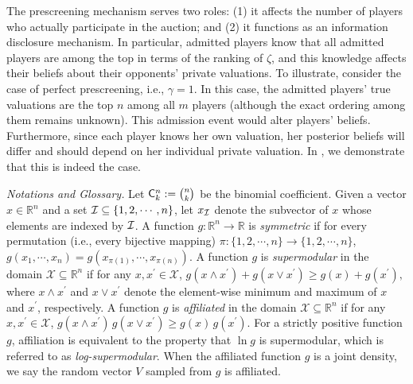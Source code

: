 The prescreening mechanism serves two roles: (1) it affects the number of players who actually participate in the auction; and (2) it functions as an information disclosure mechanism. In particular, admitted players know that all admitted players are among the top in terms of the ranking of $\zeta$, and this knowledge affects their beliefs about their opponents' private valuations. To illustrate, consider the case of perfect prescreening, i.e., $\gamma=1$. In this case, the admitted players' true valuations are the top $n$ among all $m$ players (although the exact ordering among them remains unknown).
This admission event would alter players' beliefs. Furthermore, since each player knows her own valuation, her posterior beliefs will differ and should depend on her individual private valuation.
In , we demonstrate that this is indeed the case.

\textit{Notations and Glossary.}
Let $\mathsf{C}^n_k := \binom{n}{k}$ be the binomial coefficient. Given a vector $x\in \mathbb{R}^n$ and a set $\mathcal{I}\subseteq\{1,2,\cdots,n\}$, let $x_{\mathcal{I}}$ denote the subvector of $x$ whose elements are indexed by $\mathcal{I}$.
A function $g:\mathbb{R}^n\to \mathbb{R}$ is \textit{symmetric} if for every permutation (i.e., every bijective mapping) $\pi:\{1,2,\cdots,n\}\to \{1,2,\cdots,n\}$, $g(x_1,\cdots,x_n)=g(x_{\pi(1)},\cdots,x_{\pi(n)}).$
A function $g$ is \textit{supermodular} in the domain $\mathcal{X}\subseteq\mathbb{R}^n$ if for any $x,x^\prime\in \mathcal{X}$, $g(x\wedge x^\prime)+ g(x\vee x^\prime)\geq g(x)+g(x^\prime),$
where $x\wedge x^\prime$ and $x\vee x^\prime$ denote the element-wise minimum and maximum of $x$ and $x^\prime$, respectively.
A function $g$ is \emph{affiliated} in the domain $\mathcal{X}\subseteq\mathbb{R}^n$ if for any $x,x^\prime\in \mathcal{X}$, $g(x\wedge x^\prime)\, g(x\vee x^\prime)\geq g(x)\, g(x^\prime).$
For a strictly positive function $g$, affiliation is equivalent to the property that $\ln g$ is supermodular, which is referred to as \textit{log-supermodular}.
When the affiliated function $g$ is a joint density, we say the random vector $V$ sampled from $g$ is affiliated.